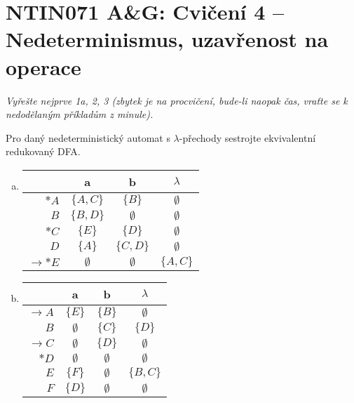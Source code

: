 \documentclass[a4paper,12pt]{amsart}
\begin{document}
\thispagestyle{empty}

\section*{NTIN071 A\&G: Cvičení 4 -- Nedeterminismus, uzavřenost na operace}


\medskip

\noindent\emph{Vyřešte nejprve 1a, 2, 3 (zbytek je na procvičení, bude-li naopak čas, vraťte se k nedodělaným příkladům z minule).}

\medskip


\medskip\begin{problem}

    Pro daný nedeterministický automat s $\lambda$-přechody sestrojte ekvivalentní redukovaný DFA.
    
    \begin{multicols}{2}
    
        \begin{enumerate}[(a)]
            \item
            \begin{tabular}{ r | c c c }
            & a & b & $\lambda$ \\ \hline
            $\ast A$ & $\{A,C\}$ & $\{B\}$ & $\emptyset$ \\
            $B$ & $\{B,D\}$ & $\emptyset$ & $\emptyset$ \\
            $\ast C$ & $\{E\}$ & $\{D\}$ & $\emptyset$ \\
            $D$ & $\{A\}$ & $\{C,D\}$ & $\emptyset$ \\
            $\to\ast E$ & $\emptyset$ & $\emptyset$ & $\{A,C\}$
            \end{tabular}
            
            \item
            \begin{tabular}{ r | c c c }
            & a & b & $\lambda$ \\ \hline
            $\to A$ & $\{E\}$ & $\{B\}$ & $\emptyset$ \\
            $B$ & $\emptyset$ & $\{C\}$ & $\{D\}$ \\
            $\to C$ & $\emptyset$ & $\{D\}$ & $\emptyset$ \\
            $\ast D$ & $\emptyset$ & $\emptyset$ & $\emptyset$ \\
            $E$ & $\{F\}$ & $\emptyset$ & $\{B,C\}$\\
            $F$ & $\{D\}$ & $\emptyset$ & $\emptyset$
            \end{tabular}
            
        \end{enumerate}
    
    \end{multicols}
\end{problem}
\end{document}
